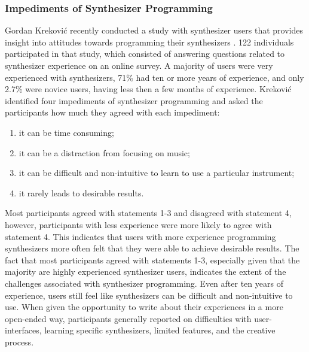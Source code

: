 \subsubsection{Impediments of Synthesizer Programming}
Gordan Krekovi\'{c} recently conducted a study with synthesizer users that provides insight into attitudes towards programming their synthesizers \cite{krekovic2019insights}. 122 individuals participated in that study, which consisted of answering questions related to synthesizer experience on an online survey. A majority of users were very experienced with synthesizers, 71\% had ten or more years of experience, and only 2.7\% were novice users, having less then a few months of experience. Krekovi\'{c} identified four impediments of synthesizer programming and asked the participants how much they agreed with each impediment:
\begin{enumerate}
    \item it can be time consuming;
    \item it can be a distraction from focusing on music;
    \item it can be difficult and non-intuitive to learn to use a particular instrument;
    \item it rarely leads to desirable results.
\end{enumerate}
Most participants agreed with statements 1-3 and disagreed with statement 4, however, participants with less experience were more likely to agree with statement 4. This indicates that users with more experience programming synthesizers more often felt that they were able to achieve desirable results. The fact that most participants agreed with statements 1-3, especially given that the majority are highly experienced synthesizer users, indicates the extent of the challenges associated with synthesizer programming. Even after ten years of experience, users still feel like synthesizers can be difficult and non-intuitive to use. When given the opportunity to write about their experiences in a more open-ended way, participants generally reported on difficulties with user-interfaces, learning specific synthesizers, limited features, and the creative process.

